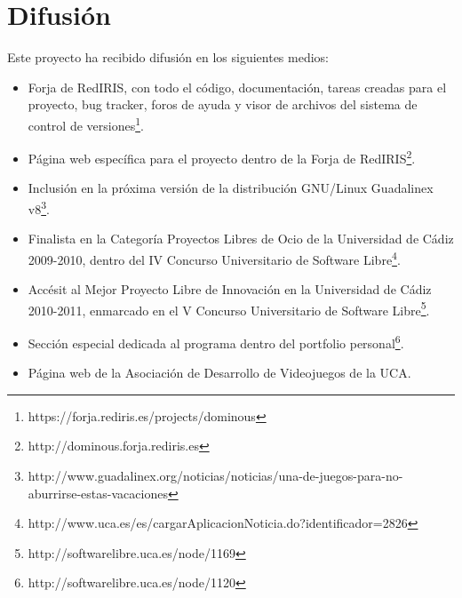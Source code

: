 

\section{Difusión}

Este proyecto ha recibido difusión en los siguientes medios:
\begin{itemize}
    \item Forja de RedIRIS, con todo el código, documentación, tareas creadas para el proyecto, bug tracker, foros de ayuda y
            visor de archivos del sistema de control de versiones\footnote{https://forja.rediris.es/projects/dominous}.
    \item Página web específica para el proyecto dentro de la Forja de RedIRIS\footnote{http://dominous.forja.rediris.es}.
    \item Inclusión en la próxima versión de la distribución GNU/Linux Guadalinex v8\footnote{http://www.guadalinex.org/noticias/noticias/una-de-juegos-para-no-aburrirse-estas-vacaciones}.
    \item Finalista en la Categoría Proyectos Libres de Ocio de la Universidad de Cádiz 2009-2010, dentro del IV
            Concurso Universitario de Software Libre\footnote{http://www.uca.es/es/cargarAplicacionNoticia.do?identificador=2826}.
    \item Accésit al Mejor Proyecto Libre de Innovación en la Universidad de Cádiz 2010-2011, enmarcado en el V
            Concurso Universitario de Software Libre\footnote{http://softwarelibre.uca.es/node/1169}.
    \item Sección especial dedicada al programa dentro del portfolio personal\footnote{http://softwarelibre.uca.es/node/1120}.
    \item Página web de la Asociación de Desarrollo de Videojuegos de la UCA.
\end{itemize}
